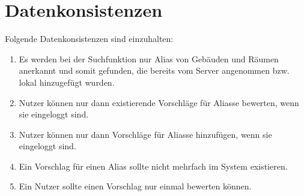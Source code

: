 \section{Datenkonsistenzen}

Folgende Datenkonsistenzen sind einzuhalten:
\begin{enumerate}[label=\textbf{/T\arabic*0/}, align=left, resume]
	\item Es werden bei der Suchfunktion nur Alias von Gebäuden und Räumen anerkannt und somit gefunden, die bereits vom Server angenommen bzw. lokal hinzugefügt wurden.
	\item Nutzer können nur dann existierende Vorschläge für Aliasse bewerten, wenn sie eingeloggt sind.
	\item Nutzer können nur dann Vorschläge für Aliasse hinzufügen, wenn sie eingeloggt sind.
	\item Ein Vorschlag für einen Alias sollte nicht mehrfach im System existieren.
	\item Ein Nutzer sollte einen Vorschlag nur einmal bewerten können.
\end{enumerate}